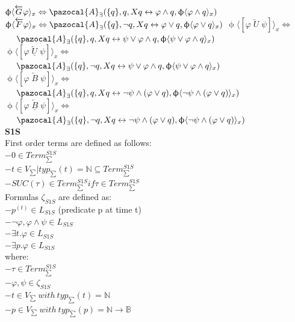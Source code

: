 \documentclass{article}
\newcommand{\Ab}{\pazocal{A}}
\begin{document}
\begin{multicols}{4}
$\upphi \langle \overleftarrow{G}\varphi\rangle_x \Leftrightarrow \Ab_\exists (\{q\},q, X q \leftrightarrow \varphi \wedge q,\upphi \langle \varphi \wedge q \rangle_x)$
$\upphi \langle \overleftarrow{F}\varphi\rangle_x \Leftrightarrow \Ab_\exists (\{q\},\neg q, X q \leftrightarrow \varphi \vee q,\upphi \langle \varphi \vee q \rangle_x)$
$\upphi \langle [\varphi \; \overleftarrow{U} \; \psi] \rangle_x \Leftrightarrow$ \\
$\ \ \ \ \Ab_\exists (\{q\},q, X q \leftrightarrow \psi \vee \varphi \wedge q, \upphi \langle \psi \vee \varphi \wedge q \rangle_x)$ \\
$\upphi \langle [\varphi \; \overleftarrow{\underline{U}} \; \psi] \rangle_x \Leftrightarrow$ \\ $\ \ \ \ \Ab_\exists (\{q\},\neg q, X q \leftrightarrow \psi \vee \varphi \wedge q, \upphi \langle \psi \vee \varphi \wedge q \rangle_x)$ \\
$\upphi \langle [\varphi\;\overleftarrow{B} \; \psi] \rangle_x \Leftrightarrow$ \\
$\ \ \ \ \Ab_\exists (\{q\},q, X q \leftrightarrow \neg\psi \wedge (\varphi \vee q), \upphi \langle \neg \psi \wedge (\varphi \vee q) \rangle_x)$ \\
$\upphi \langle [\varphi\;\underline{\overleftarrow{B}} \; \psi] \rangle_x \Leftrightarrow$ \\ $\ \ \ \ \Ab_\exists (\{q\},\neg q, X q \leftrightarrow \neg\psi \wedge (\varphi \vee q), \upphi \langle \neg \psi \wedge (\varphi \vee q) \rangle_x)$ \\



\textbf{S1S} \\
First order terms are defined as follows: \\
$-0 \in Term _{\sum}^{S1S} $\\
$-{\textit{t} \in V_{\sum} | typ_{\sum}(\textit{t}) = \mathbb{N}} \subseteq Term _{\sum}^{S1S} $ \\
$-SUC(\tau) \in Term _{\sum}^{S1S} if \tau \in Term _{\sum}^{S1S}$ \\
Formulas $\zeta_{S1S}$ are defined as: \\
$-p^{(t)} \in L_{S1S}$ (predicate p at time t)\\
$-\neg\varphi, \varphi \wedge \psi \in L_{S1S}$ \\
$-\exists t. \varphi \in L_{S1S} $ \\
$-\exists p. \varphi \in L_{S1S} $ \\
where: \\
$-\tau \in Term _{\sum}^{S1S} $ \\
$-\varphi, \psi \in \zeta_{S1S} $ \\
$-t \in V_{\sum} \ with \ typ_{\sum}(t) = \mathbb{N}$ \\
$-p \in V_{\sum} \ with \ typ_{\sum}(p) = \mathbb{N} \rightarrow \mathbb{B}$ \\


\end{multicols}
\end{document}
